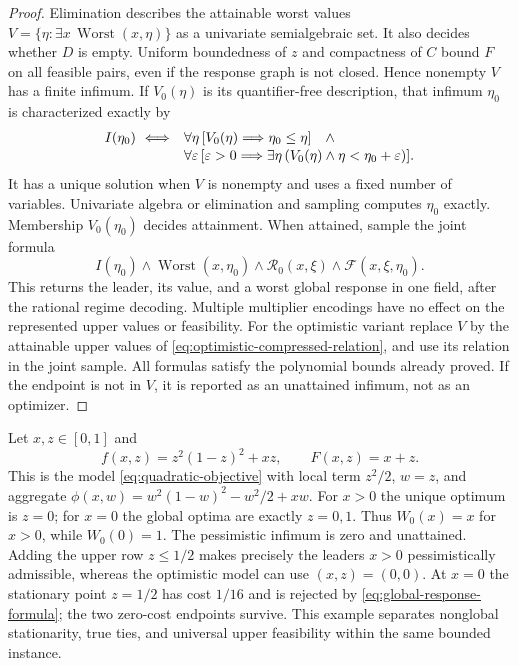 \begin{proof}
Elimination describes the attainable worst values
$V=\{\eta:\exists x\,\operatorname{Worst}(x,\eta)\}$ as a univariate
semialgebraic set. It also decides whether $D$ is empty. Uniform boundedness
of $z$ and compactness of $C$ bound $F$ on all feasible pairs, even if
the response graph is not closed. Hence nonempty $V$ has a finite
infimum. If $V_0(\eta)$ is its quantifier-free description, that
infimum $\eta_0$ is characterized exactly by
\begin{equation}\label{eq:infimum-predicate}
 \begin{split}
 I(\eta_0)\ \Longleftrightarrow\quad&
 \forall\eta\,[V_0(\eta)\Longrightarrow\eta_0\le\eta]\quad\wedge\\[-2pt]
 &\forall\varepsilon\,[\varepsilon>0\Longrightarrow
            \exists\eta\,(V_0(\eta)\wedge\eta<\eta_0+\varepsilon)].
 \end{split}
\end{equation}
It has a unique solution when $V$ is nonempty and uses a fixed number
of variables. Univariate algebra or elimination and sampling computes
$\eta_0$ exactly. Membership $V_0(\eta_0)$ decides attainment.
When attained, sample the joint formula
\[
 I(\eta_0)\wedge\operatorname{Worst}(x,\eta_0)
       \wedge\mathcal R_0(x,\xi)\wedge\mathcal F(x,\xi,\eta_0).
\]
This returns the leader, its value, and a worst global response in one
field, after the rational regime decoding. Multiple multiplier
encodings have no effect on the represented upper values or feasibility.
For the optimistic variant replace $V$ by the attainable upper values
of \eqref{eq:optimistic-compressed-relation}, and use its relation in
the joint sample. All formulas satisfy the polynomial bounds already
proved. If the endpoint is not in $V$, it is reported as an unattained
infimum, not as an optimizer.
\end{proof}

\begin{example}\label{ex:pessimistic-nonattainment}
Let $x,z\in[0,1]$ and
\[
             f(x,z)=z^2(1-z)^2+xz,\qquad F(x,z)=x+z.
\]
This is the model \eqref{eq:quadratic-objective} with local term $z^2/2$,
$w=z$, and aggregate
$\phi(x,w)=w^2(1-w)^2-w^2/2+xw$.
For $x>0$ the unique optimum is $z=0$; for $x=0$ the global optima
are exactly $z=0,1$. Thus $W_0(x)=x$ for $x>0$, while $W_0(0)=1$.
The pessimistic infimum is zero and unattained. Adding the upper row
$z\le1/2$ makes precisely the leaders $x>0$ pessimistically admissible,
whereas the optimistic model can use $(x,z)=(0,0)$. At $x=0$ the
stationary point $z=1/2$ has cost $1/16$ and is rejected by
\eqref{eq:global-response-formula}; the two zero-cost endpoints survive.
This example separates nonglobal stationarity, true ties, and universal
upper feasibility within the same bounded instance.
\end{example}

